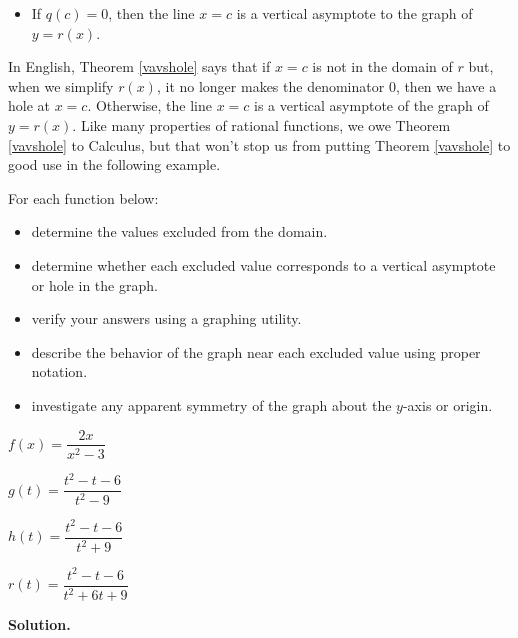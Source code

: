 \begin{ex}
\begin{tcolorbox}
\begin{thm}
\begin{itemize}
\item  If $q(c) = 0$, then the line $x=c$ is a vertical asymptote to the graph of $y=r(x)$.

\end{itemize}

\end{thm}

\end{tcolorbox}

In English,  Theorem \ref{vavshole} says that if $x=c$ is not in the domain of $r$ but, when we simplify $r(x)$, it no longer makes the denominator $0$, then we have a hole at $x=c$.  Otherwise, the line $x=c$ is a vertical asymptote  of the graph of $y=r(x)$.   Like many properties of rational functions, we owe Theorem \ref{vavshole} to Calculus, but that won't stop us from  putting Theorem \ref{vavshole} to good use in the following example.

\begin{ex}  \label{vavsholeexample}  For each function below:

\begin{itemize}

\item  determine the values excluded from the domain.

\item   determine whether each excluded value corresponds to a vertical asymptote or hole in the graph.

\item  verify your answers using a graphing utility.

\item  describe the behavior of the graph near each excluded value using proper notation.  

\item  investigate any apparent symmetry of the graph about the $y$-axis or origin.

\end{itemize}

\begin{shortenumerate}[MMMMMM]
\item  $f(x) = \dfrac{2x}{x^2-3}$
\item  $g(t) = \dfrac{t^2-t-6}{t^2-9}$
\item  $h(t) = \dfrac{t^2-t-6}{t^2+9}$
\item  $r(t) = \dfrac{t^2-t-6}{t^2+6t+9}$
\end{shortenumerate}


{ \bf Solution.} 


\end{ex}
\end{ex}
